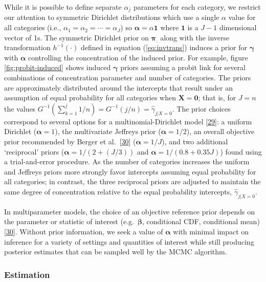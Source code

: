 \documentclass[
]{article}
\begin{document}
While it is possible to define separate \(\alpha_j\) parameters for each category, we restrict our attention to symmetric Dirichlet distributions which use a single \(\alpha\) value for all categories (i.e., \(\alpha_1 = \alpha_2 = \cdots = \alpha_J\)) so \(\boldsymbol{\alpha}=\alpha\boldsymbol{1}\) where \(\boldsymbol{1}\) is a \(J-1\) dimensional vector of 1s. The symmetric Dirichlet prior on \(\boldsymbol{\pi_{.}}\) along with the inverse transformation \(h^{-1}(\cdot)\) defined in equation (\ref{eq:invtrans}) induces a prior for \(\boldsymbol{\gamma}\) with \(\boldsymbol{\alpha}\) controlling the concentration of the induced prior. For example, figure \ref{fig:probit-induced} shows induced \(\boldsymbol{\gamma}\) priors assuming a probit link for several combinations of concentration parameter and number of categories. The priors are approximately distributed around the intercepts that result under an assumption of equal probability for all categories when \(\boldsymbol{X}=\boldsymbol{0}\); that is, for \(J=n\) the values \(G^{-1}(\sum_{k=1}^j 1/n)=G^{-1}(j/n)=\hat{\gamma}_{j|X=0}\). The prior choices correspond to several options for a multinomial-Dirichlet model {{[}\protect\hyperlink{ref-gelman_bayesian_2014}{29}{]}}: a uniform Dirichlet (\(\boldsymbol{\alpha}=1\)), the multivariate Jeffreys prior (\(\boldsymbol{\alpha}=1/2\)), an overall objective prior recommended by Berger et al.~{{[}\protect\hyperlink{ref-berger_overall_2015}{30}{]}} (\(\boldsymbol{\alpha}=1/J\)), and two additional `reciprocal' priors (\(\boldsymbol{\alpha}=1/(2+(J/3))\) and \(\boldsymbol{\alpha}=1/(0.8+0.35J)\)) found using a trial-and-error procedure. As the number of categories increases the uniform and Jeffreys priors more strongly favor intercepts assuming equal probability for all categories; in contrast, the three reciprocal priors are adjusted to maintain the same degree of concentration relative to the equal probability intercepts, \(\hat{\gamma}_{j|X=0}\).

In multiparameter models, the choice of an objective reference prior depends on the parameter or statistic of interest (e.g.~\(\boldsymbol{\beta}\), conditional CDF, conditional mean) {{[}\protect\hyperlink{ref-berger_overall_2015}{30}{]}}. Without prior information, we seek a value of \(\boldsymbol{\alpha}\) with minimal impact on inference for a variety of settings and quantities of interest while still producing posterior estimates that can be sampled well by the MCMC algorithm.

\hypertarget{estimation}{%
\subsubsection{Estimation}\label{estimation}}
\end{document}
